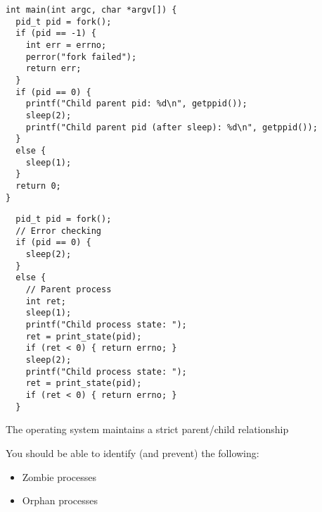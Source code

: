   \begin{slide}


    \begin{verbatim}
int main(int argc, char *argv[]) {
  pid_t pid = fork();
  if (pid == -1) {
    int err = errno;
    perror("fork failed");
    return err;
  }
  if (pid == 0) {
    printf("Child parent pid: %d\n", getppid());
    sleep(2);
    printf("Child parent pid (after sleep): %d\n", getppid());
  }
  else {
    sleep(1);
  }
  return 0;
}

    \end{verbatim}

  \end{slide}

  \begin{slide}


    \begin{verbatim}
  pid_t pid = fork();
  // Error checking
  if (pid == 0) {
    sleep(2);
  }
  else {
    // Parent process
    int ret;
    sleep(1);
    printf("Child process state: ");
    ret = print_state(pid);
    if (ret < 0) { return errno; }
    sleep(2);
    printf("Child process state: ");
    ret = print_state(pid);
    if (ret < 0) { return errno; }
  }
    \end{verbatim}

  \end{slide}

  \begin{slide}


    The operating system maintains a strict parent/child relationship
    \medskip
    
    You should be able to identify (and prevent) the following:
    \begin{itemize}
      \item Zombie processes
      \item Orphan processes
    \end{itemize}
  \end{slide}

